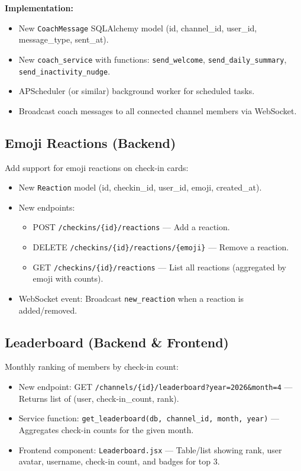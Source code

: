 \documentclass[11pt]{article}
\begin{document}
\textbf{Implementation:}
\begin{itemize}[leftmargin=1.5em]
    \item New \texttt{CoachMessage} SQLAlchemy model (id, channel\_id, user\_id, message\_type, sent\_at).
    \item New \texttt{coach\_service} with functions: \texttt{send\_welcome}, \texttt{send\_daily\_summary}, \texttt{send\_inactivity\_nudge}.
    \item APScheduler (or similar) background worker for scheduled tasks.
    \item Broadcast coach messages to all connected channel members via WebSocket.
\end{itemize}

\subsection{Emoji Reactions (Backend)}

Add support for emoji reactions on check-in cards:

\begin{itemize}[leftmargin=1.5em]
    \item New \texttt{Reaction} model (id, checkin\_id, user\_id, emoji, created\_at).
    \item New endpoints:
    \begin{itemize}
        \item POST \texttt{/checkins/\{id\}/reactions} --- Add a reaction.
        \item DELETE \texttt{/checkins/\{id\}/reactions/\{emoji\}} --- Remove a reaction.
        \item GET \texttt{/checkins/\{id\}/reactions} --- List all reactions (aggregated by emoji with counts).
    \end{itemize}
    \item WebSocket event: Broadcast \texttt{new\_reaction} when a reaction is added/removed.
\end{itemize}

\subsection{Leaderboard (Backend \& Frontend)}

Monthly ranking of members by check-in count:

\begin{itemize}[leftmargin=1.5em]
    \item New endpoint: GET \texttt{/channels/\{id\}/leaderboard?year=2026\&month=4} --- Returns list of (user, check-in\_count, rank).
    \item Service function: \texttt{get\_leaderboard(db, channel\_id, month, year)} --- Aggregates check-in counts for the given month.
    \item Frontend component: \texttt{Leaderboard.jsx} --- Table/list showing rank, user avatar, username, check-in count, and badges for top 3.
\end{itemize}
\end{document}
